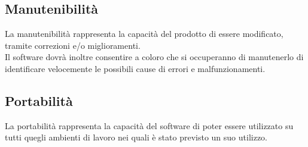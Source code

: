 \subsection{Manutenibilità}
La manutenibilità rappresenta la capacità del prodotto di essere modificato, tramite correzioni e/o miglioramenti. \\ Il software dovrà inoltre consentire a coloro che si occuperanno di manutenerlo di identificare velocemente le possibili cause di errori e malfunzionamenti.

\subsection{Portabilità}
La portabilità rappresenta la capacità del software di poter essere utilizzato su tutti quegli ambienti di lavoro nei quali è stato previsto un suo utilizzo.
